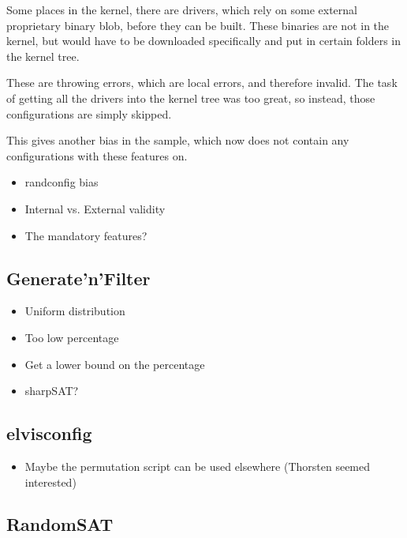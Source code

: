 \documentclass[a4paper,11pt]{article}
\begin{document}
Some places in the kernel, there are drivers, which rely on some external 
proprietary binary blob, before they can be built. These binaries are not in 
the kernel, but would have to be downloaded specifically and put in certain 
folders in the kernel tree.

These are throwing errors, which are local errors, and therefore invalid. The 
task of getting all the drivers into the kernel tree was too great, so instead, 
those configurations are simply skipped.

This gives another bias in the sample, which now does not contain any 
configurations with these features on.


\begin{itemize}
    \item randconfig bias
    \item Internal vs. External validity
    \item The mandatory features?
\end{itemize}

\subsection{Generate'n'Filter}



\begin{itemize}
    \item Uniform distribution
    \item Too low percentage
    \item Get a lower bound on the percentage
    \item sharpSAT?
\end{itemize}

\subsection{elvisconfig}

\begin{itemize}
    \item Maybe the permutation script can be used elsewhere (Thorsten seemed 
        interested)
\end{itemize}

\subsection{RandomSAT}
\end{document}
